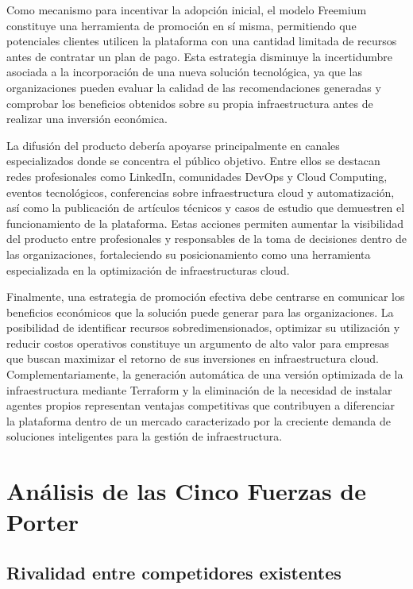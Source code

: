 Como mecanismo para incentivar la adopción inicial, el modelo Freemium constituye una herramienta de promoción en sí misma, permitiendo que potenciales clientes utilicen la plataforma con una cantidad limitada de recursos antes de contratar un plan de pago. Esta estrategia disminuye la incertidumbre asociada a la incorporación de una nueva solución tecnológica, ya que las organizaciones pueden evaluar la calidad de las recomendaciones generadas y comprobar los beneficios obtenidos sobre su propia infraestructura antes de realizar una inversión económica.

La difusión del producto debería apoyarse principalmente en canales especializados donde se concentra el público objetivo. Entre ellos se destacan redes profesionales como LinkedIn, comunidades DevOps y Cloud Computing, eventos tecnológicos, conferencias sobre infraestructura cloud y automatización, así como la publicación de artículos técnicos y casos de estudio que demuestren el funcionamiento de la plataforma. Estas acciones permiten aumentar la visibilidad del producto entre profesionales y responsables de la toma de decisiones dentro de las organizaciones, fortaleciendo su posicionamiento como una herramienta especializada en la optimización de infraestructuras cloud.

Finalmente, una estrategia de promoción efectiva debe centrarse en comunicar los beneficios económicos que la solución puede generar para las organizaciones. La posibilidad de identificar recursos sobredimensionados, optimizar su utilización y reducir costos operativos constituye un argumento de alto valor para empresas que buscan maximizar el retorno de sus inversiones en infraestructura cloud. Complementariamente, la generación automática de una versión optimizada de la infraestructura mediante Terraform y la eliminación de la necesidad de instalar agentes propios representan ventajas competitivas que contribuyen a diferenciar la plataforma dentro de un mercado caracterizado por la creciente demanda de soluciones inteligentes para la gestión de infraestructura.

\section{Análisis de las Cinco Fuerzas de Porter}

\subsection{Rivalidad entre competidores existentes}

